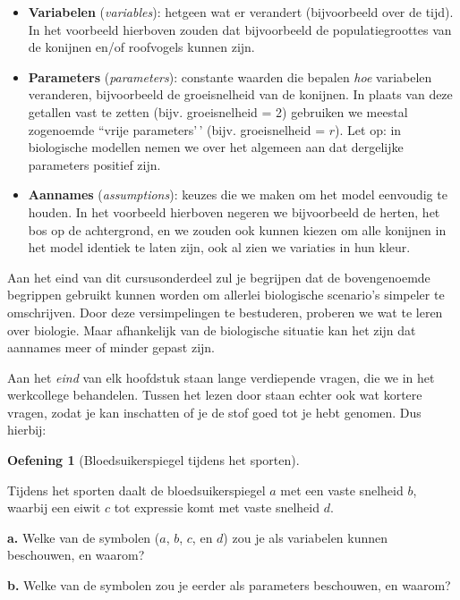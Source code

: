 \documentclass[
  a4paper,
]{scrbook}
\theoremstyle{definition}
\newtheorem{exercise}{Oefening}[chapter]
\theoremstyle{remark}
\begin{document}
\begin{itemize}
\item
  \textbf{Variabelen} (\emph{variables}): hetgeen wat er verandert
  (bijvoorbeeld over de tijd). In het voorbeeld hierboven zouden dat
  bijvoorbeeld de populatiegroottes van de konijnen en/of roofvogels
  kunnen zijn.
\item
  \textbf{Parameters} (\emph{parameters}): constante waarden die bepalen
  \emph{hoe} variabelen veranderen, bijvoorbeeld de groeisnelheid van de
  konijnen. In plaats van deze getallen vast te zetten (bijv.
  groeisnelheid = 2) gebruiken we meestal zogenoemde ``vrije
  parameters'\,' (bijv. groeisnelheid = \(r\)). Let op: in biologische
  modellen nemen we over het algemeen aan dat dergelijke parameters
  positief zijn.
\item
  \textbf{Aannames} (\emph{assumptions}): keuzes die we maken om het
  model eenvoudig te houden. In het voorbeeld hierboven negeren we
  bijvoorbeeld de herten, het bos op de achtergrond, en we zouden ook
  kunnen kiezen om alle konijnen in het model identiek te laten zijn,
  ook al zien we variaties in hun kleur.
\end{itemize}

Aan het eind van dit cursusonderdeel zul je begrijpen dat de
bovengenoemde begrippen gebruikt kunnen worden om allerlei biologische
scenario's simpeler te omschrijven. Door deze versimpelingen te
bestuderen, proberen we wat te leren over biologie. Maar afhankelijk van
de biologische situatie kan het zijn dat aannames meer of minder gepast
zijn.

Aan het \emph{eind} van elk hoofdstuk staan lange verdiepende vragen,
die we in het werkcollege behandelen. Tussen het lezen door staan echter
ook wat kortere vragen, zodat je kan inschatten of je de stof goed tot
je hebt genomen. Dus hierbij:

\begin{exercise}[Bloedsuikerspiegel tijdens het
sporten]\protect\hypertarget{exr-variabelen-en-parameters}{}\label{exr-variabelen-en-parameters}

Tijdens het sporten daalt de bloedsuikerspiegel \(a\) met een vaste
snelheid \(b\), waarbij een eiwit \(c\) tot expressie komt met vaste
snelheid \(d\).

\textbf{a.} Welke van de symbolen (\(a\), \(b\), \(c\), en \(d\)) zou je
als variabelen kunnen beschouwen, en waarom?

\textbf{b.} Welke van de symbolen zou je eerder als parameters
beschouwen, en waarom?

\end{exercise}
\end{document}
